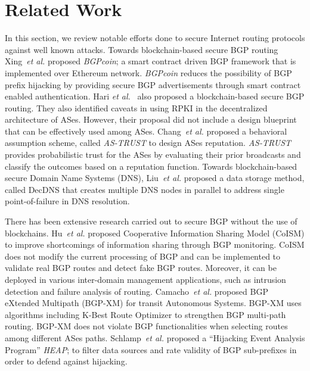 \documentclass[conference]{IEEEtran}
\newcommand{\etal}{{\em et al.}\xspace}
\begin{document}
\section{Related Work}\label{sec:rw}
In this section, we review notable efforts done to secure Internet routing protocols against well known attacks. Towards blockchain-based secure BGP routing Xing~\etal\cite{XingWW18} proposed  {\em BGPcoin}; a smart contract driven BGP framework that is implemented over Ethereum network. {\em BGPcoin} reduces the possibility of BGP prefix hijacking by providing secure BGP advertisements through smart contract enabled authentication. Hari \etal~\cite{HariL16} also proposed a blockchain-based secure BGP routing. They also identified caveats in using RPKI in the decentralized architecture of ASes. However, their proposal did not include a design blueprint that can be effectively used among ASes. Chang~\etal\cite{ChangVWKLSL11} proposed a behavioral assumption scheme, called {\em AS-TRUST} to design ASes reputation. {\em AS-TRUST} provides probabilistic trust for the ASes by evaluating their prior broadcasts and classify the outcomes based on a reputation function. Towards blockchain-based secure Domain Name Systems (DNS), Liu~\etal\cite{LiuLCHXW18} proposed a data storage method, called DecDNS that creates multiple DNS nodes in parallel to address single point-of-failure in DNS resolution. 

There has been extensive research carried out to secure BGP without the use of blockchains. Hu~\etal\cite{HuWL15} proposed Cooperative Information Sharing Model (CoISM) to improve shortcomings of information sharing through BGP monitoring. CoISM does not modify the current processing of BGP and can be implemented to validate real BGP routes and detect fake BGP routes. Moreover, it can be deployed in various inter-domain management applications, such as intrusion detection and failure analysis of routing. Camacho~\etal\cite{CamachoGBV13} proposed BGP eXtended Multipath (BGP-XM) for transit Autonomous Systems. BGP-XM uses algorithms including K-Best Route Optimizer  to strengthen BGP multi-path routing. BGP-XM does not violate BGP functionalities when selecting routes among different ASes paths. Schlamp~\etal\cite{SchlampHJCB16} proposed a ``Hijacking Event Analysis Program'' {\em HEAP}; to filter data sources and rate validity of BGP sub-prefixes in order to defend against hijacking. 

\end{document}
